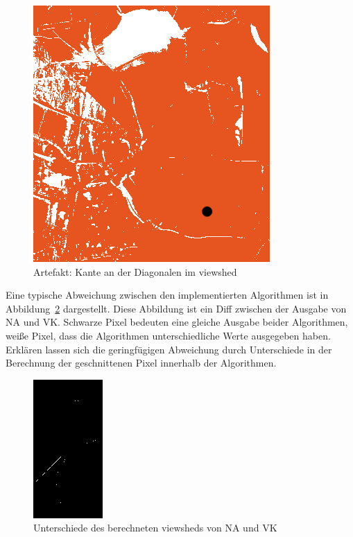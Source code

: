 \begin{figure}[!ht]
 \centering
 \includegraphics[scale=0.5]{bilder/dgm_art}
 \caption{Artefakt: Kante an der Diagonalen im viewshed}
 \label{dgm_art}
\end{figure}

Eine typische Abweichung zwischen den implementierten Algorithmen ist in Abbildung~\ref{dgm_diff} dargestellt. 
Diese Abbildung ist ein Diff zwischen der Ausgabe von NA und VK. Schwarze Pixel bedeuten eine gleiche Ausgabe beider Algorithmen, weiße Pixel, dass die Algorithmen unterschiedliche Werte ausgegeben haben. 
Erklären lassen sich die geringfügigen Abweichung durch Unterschiede in der Berechnung der geschnittenen Pixel innerhalb der Algorithmen. 
\begin{figure}[!ht]
 \centering
 \includegraphics[scale=1]{bilder/dgm_diff}
 \caption{Unterschiede des berechneten viewsheds von NA und VK}
 \label{dgm_diff}
\end{figure}